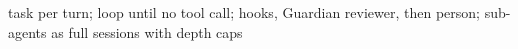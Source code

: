 task per turn; loop until no tool call; hooks, Guardian reviewer, then person; sub-agents as full sessions with depth caps
